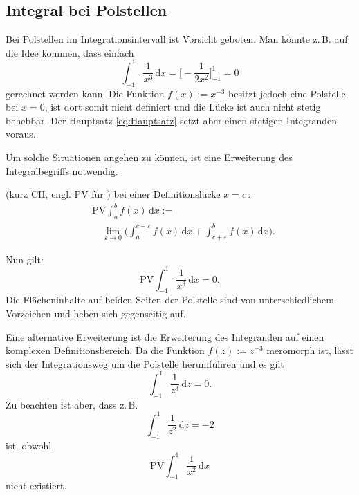 \subsection{Integral bei Polstellen}
Bei Polstellen im Integrationsintervall ist Vorsicht geboten.
Man könnte z.\,B. auf die Idee kommen, dass einfach%
\begin{equation}
\int_{-1}^1 \frac{1}{x^3}\,\mathrm dx
= \Big[-\frac{1}{2x^2}\Big]_{-1}^1 = 0
\end{equation}
gerechnet werden kann. Die Funktion $f(x):=x^{-3}$ besitzt jedoch eine
Polstelle bei $x=0$, ist dort somit nicht definiert und die Lücke
ist auch nicht stetig behebbar. Der Hauptsatz \eqref{eq:Hauptsatz}
setzt aber einen stetigen Integranden voraus. 

Um solche Situationen angehen zu können, ist eine Erweiterung
des Integralbegriffs notwendig.

\begin{definition}
(kurz CH, engl. PV für )
bei einer Definitionslücke $x=c$\,:
\begin{equation}
\begin{split}
&\mathrm{PV}\int_a^b f(x)\,\mathrm dx :=\\
&\quad\lim_{\varepsilon\to 0}\bigg(\int_a^{c-\varepsilon} f(x)\,\mathrm dx
+\int_{c+\varepsilon}^b f(x)\,\mathrm dx\bigg).
\end{split}
\end{equation}
\end{definition}
Nun gilt:
\begin{equation}
\mathrm{PV}\int_{-1}^1 \frac{1}{x^3}\,\mathrm dx = 0.
\end{equation}
Die Flächeninhalte auf beiden Seiten der Polstelle sind
von unterschiedlichem Vorzeichen und heben sich gegenseitig auf.

Eine alternative Erweiterung
ist die Erweiterung des Integranden auf einen komplexen
Definitionsbereich. Da die Funktion $f(z):=z^{-3}$ meromorph
ist, lässt sich der Integrationsweg um die Polstelle herumführen
und es gilt%
\begin{equation}
\int_{-1}^1 \frac{1}{z^3}\,\mathrm dz = 0.
\end{equation}
Zu beachten ist aber, dass z.\,B.
\begin{equation}
\int_{-1}^1 \frac{1}{z^2}\,\mathrm dz = -2
\end{equation}
ist, obwohl
\begin{equation}
\mathrm{PV}\int_{-1}^1 \frac{1}{x^2}\,\mathrm dx
\end{equation}
nicht existiert.

